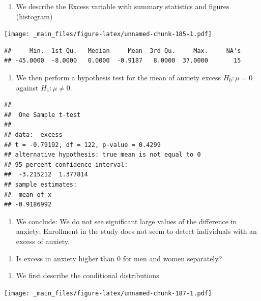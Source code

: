\documentclass[
]{book}
\providecommand{\tightlist}{%
  \setlength{\itemsep}{0pt}\setlength{\parskip}{0pt}}
\begin{document}
\begin{enumerate}
\def\labelenumi{\alph{enumi}.}
\tightlist
\item
  We describe the Excess variable with summary statistics and figures (histogram)
\end{enumerate}

\texttt{[image: \_main\_files/figure-latex/unnamed-chunk-185-1.pdf]}

\begin{verbatim}
##     Min.  1st Qu.   Median     Mean  3rd Qu.     Max.     NA's 
## -45.0000  -8.0000   0.0000  -0.9187   8.0000  37.0000       15
\end{verbatim}

\begin{enumerate}
\def\labelenumi{\alph{enumi}.}
\setcounter{enumi}{1}
\tightlist
\item
  We then perform a hypothesis test for the mean of anxiety excess \(H_0:\mu=0\) against \(H_1:\mu \neq 0\).
\end{enumerate}

\begin{verbatim}
## 
##  One Sample t-test
## 
## data:  excess
## t = -0.79192, df = 122, p-value = 0.4299
## alternative hypothesis: true mean is not equal to 0
## 95 percent confidence interval:
##  -3.215212  1.377814
## sample estimates:
##  mean of x 
## -0.9186992
\end{verbatim}

\begin{enumerate}
\def\labelenumi{\alph{enumi}.}
\setcounter{enumi}{2}
\tightlist
\item
  We conclude: We do not see significant large values of the difference in anxiety; Enrollment in the study does not seem to detect individuals with an excess of anxiety.
\end{enumerate}

\begin{enumerate}
\def\labelenumi{\arabic{enumi}.}
\setcounter{enumi}{1}
\tightlist
\item
  Is excess in anxiety higher than \(0\) for men and women separately?
\end{enumerate}

\begin{enumerate}
\def\labelenumi{\alph{enumi}.}
\tightlist
\item
  We first describe the conditional distributions
\end{enumerate}

\texttt{[image: \_main\_files/figure-latex/unnamed-chunk-187-1.pdf]}
\end{document}
